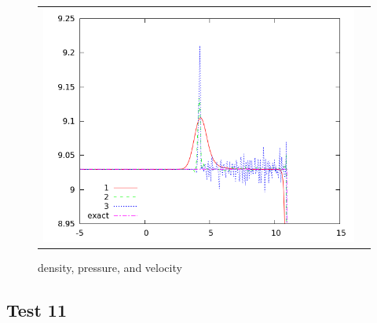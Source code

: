 \documentclass[10pt,preprint]{aastex}
\begin{document}
\begin{figure}[h]
\begin{center}
\begin{tabular}{cc}
      \includegraphics[width=.4\textwidth]{vel10zoom.png} \\
	\end{tabular}	
  \end{center}
  \caption{density, pressure, and velocity}
\end{figure}



\clearpage

\subsection{Test 11}
\end{document}
